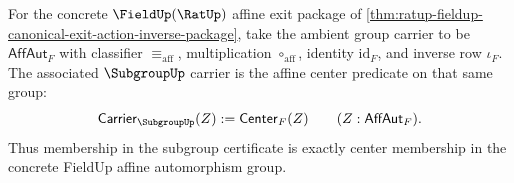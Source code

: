 \begin{definition}
\label{def:ratup-fieldup-affine-center-subgroup-carrier}
For the concrete $\FieldUp(\RatUp)$ affine exit package of
\autoref{thm:ratup-fieldup-canonical-exit-action-inverse-package}, take the
ambient group carrier to be $\mathsf{AffAut}_F$ with classifier
$\equiv_{\mathrm{aff}}$, multiplication $\circ_{\mathrm{aff}}$, identity
$\mathrm{id}_F$, and inverse row $\iota_F$. The associated $\SubgroupUp$
carrier is the affine center predicate on that same group:
$$
\mathsf{Carrier}_{\SubgroupUp}(Z) := \mathsf{Center}_F(Z)
\qquad (Z:\mathsf{AffAut}_F).
$$
Thus membership in the subgroup certificate is exactly center membership in
the concrete FieldUp affine automorphism group.
\end{definition}

